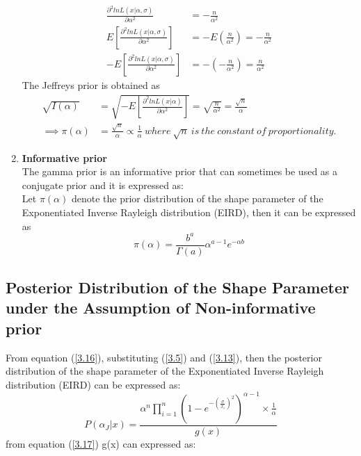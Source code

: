 \documentclass[a4paper,12pt]{report}
\newcommand{\para}{\hspace{0.5cm}}
\begin{document}
\begin{enumerate}
\[\begin{split}
\end{split}\]
\begin{equation}\label{3.12} 
\begin{split}
\frac{\partial^2 ln L(x|\alpha,\sigma)}{\partial \alpha^2} &=-\frac{n}{\alpha^2}\\
E\left[\frac{\partial^2 ln L(x|\alpha,\sigma)}{\partial \alpha^2}\right] &=-E\left(\frac{n}{\alpha^2}\right)=-\frac{n}{\alpha^2}\\
-E\left[\frac{\partial^2 ln L(x|\alpha,\sigma)}{\partial \alpha^2}\right] &= -\left(-\frac{n}{\alpha^2}\right)=\frac{n}{\alpha^2}
\end{split}
\end{equation}
The Jeffreys prior is obtained as 
\begin{equation}\label{3.13}
\begin{split}
\sqrt{I(\alpha)}&=\sqrt{-E\left[\frac{\partial^2 ln L(x|\alpha)}{\partial \alpha^2}\right] }= \sqrt{\frac{n}{\alpha^2}}=\frac{\sqrt{n}}{\alpha}\\
\implies \pi(\alpha)&=\frac{\sqrt{n}}{\alpha}\propto\frac{1}{\alpha}\ where\ \sqrt{n} \ is \ the\ constant\ of\ proportionality.
\end{split}
\end{equation}

\item \textbf{Informative prior}\\
\noindent\para The gamma prior is an informative prior that can sometimes be used as a conjugate prior and it is expressed as: \\
Let $\pi(\alpha)$ denote the prior distribution of the shape parameter of the Exponentiated Inverse Rayleigh distribution (EIRD), then it can be expressed as 
\begin{equation}\label{3.14}
\pi(\alpha)=\frac{b^a}{\Gamma(a)}\alpha^{a-1}e^{-\alpha b}
\end{equation}
\end{enumerate}

\subsection{Posterior Distribution of the Shape Parameter under the Assumption of Non-informative prior}	

\noindent\para From equation (\ref{3.16}), substituting (\ref{3.5}) and (\ref{3.13}), then the posterior distribution of the shape parameter of the Exponentiated Inverse Rayleigh distribution (EIRD) can be expressed as:
\begin{equation}\label{3.18}
P(\alpha_J|x)=\frac{\alpha^n \prod\limits_{ i=1 }^{n}\left(1-e^{-\left(\frac{\sigma}{x_i}\right)^2}\right)^{\alpha-1}\times \frac{1}{\alpha}}{g(x)}
\end{equation}
from equation (\ref{3.17}) g(x) can expressed as: 
\end{document}
